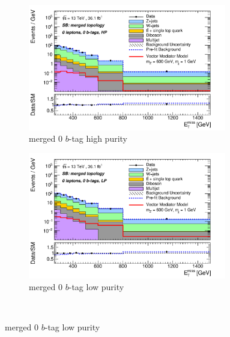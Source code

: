 \begin{figure}[htbp]
\centering
  \begin{subfigure}{0.49\textwidth}
    \centering
    \includegraphics[width=0.95\textwidth]{figures/monoV/postfit/monoV_0lep_0tag_merged_substrPass_massFail_met_XS.pdf}
    \caption{merged 0 \(b\)-tag high purity}
  \end{subfigure}
  \begin{subfigure}{0.49\textwidth}
    \centering
    \includegraphics[width=0.95\textwidth]{figures/monoV/postfit/monoV_0lep_0tag_merged_substrFail_massFail_met_XS.pdf}
    \caption{merged 0 \(b\)-tag low purity}
  \end{subfigure} \\


\end{figure}
